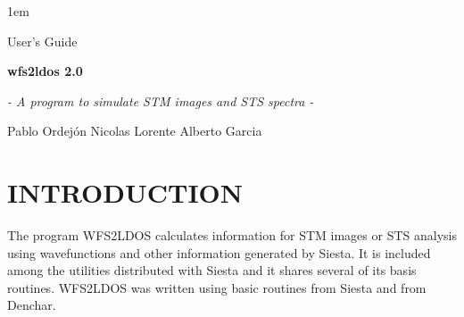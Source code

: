 %
%
%



\textheight 22cm
\textwidth 16cm
\oddsidemargin 1mm
\topmargin -15mm

\baselineskip=14pt
\parskip 5pt
\parindent 1em




\begin{titlepage}

\begin{center}

\vspace{1cm}

{\huge {\sc User's Guide}}

\vspace{4cm}

{\Huge {\bf {\sc wfs2ldos} 2.0} }

\vspace{0.5 cm}

{\Large {\it - A program to simulate STM images and STS spectra -}}


\vspace{3cm}

{\Large Pablo Ordej\'on}
\vspace{1cm}
{\Large Nicolas Lorente}
\vspace{1cm}
{\Large Alberto Garcia}
\vspace{7mm}
\end{center}

\end{titlepage}


\tableofcontents

\newpage



\section{INTRODUCTION}

The program {\sc WFS2LDOS} calculates information for STM images or STS
analysis using wavefunctions and other information generated by {\sc
  Siesta}.  It is included among the utilities distributed with {\sc
  Siesta} and it shares several of its basis routines.  {\sc WFS2LDOS} was
written using basic routines from {\sc Siesta} and from {\sc Denchar}.

